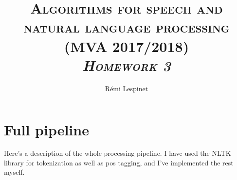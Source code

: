 \documentclass[a4paper, 11pt]{article}
\title{\textsc{Algorithms for speech and natural language processing (MVA 2017/2018) \\ \emph{Homework 3}}}
\author{Rémi Lespinet}
\date{}
\begin{document}
\maketitle
\vspace{-1em}
\thispagestyle{fancy}


\section{Full pipeline}

Here's a description of the whole processing pipeline. I have used the
NLTK library for tokenization as well as pos tagging, and I've
implemented the rest myself.

\end{document}
